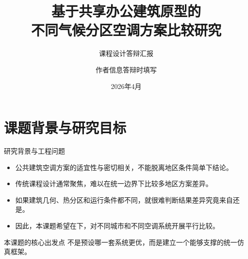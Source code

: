 \documentclass{beamer}
\title{基于共享办公建筑原型的\\不同气候分区空调方案比较研究}
\subtitle{课程设计答辩汇报}
\author{作者信息答辩时填写}
\date{2026年4月}
\begin{document}
\maketitle

\section{课题背景与研究目标}

\begin{frame}{研究背景与工程问题}
\small
\begin{itemize}
    \item 公共建筑空调方案的适宜性与密切相关，不能脱离地区条件简单下结论。
    \item 传统课程设计通常聚焦，难以在统一边界下比较多地区方案差异。
    \item 如果建筑几何、热分区和运行条件都不同，就很难判断结果差异究竟来自还是。
    \item 因此，本课题希望在下，对不同城市和不同空调系统开展平行比较。
\end{itemize}

\vspace{0.4em}
\begin{alertblock}{本课题的核心出发点}
不是预设哪一套系统更优，而是建立一个能够支撑的统一仿真框架。
\end{alertblock}
\end{frame}
\end{document}
